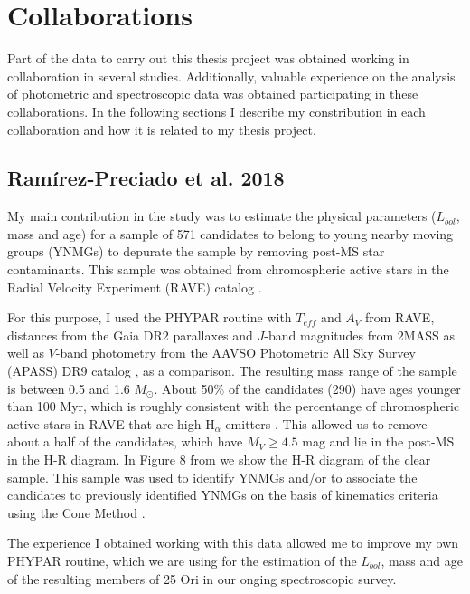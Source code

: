 \documentclass[12pt]{article}
\begin{document}
\appendix

\section{Collaborations}
\label{sec:collaborations}
Part of the data to carry out this thesis project was obtained working in collaboration in several studies. Additionally, valuable experience on the analysis of photometric and spectroscopic data was obtained participating in these collaborations. In the following sections I describe my constribution in each collaboration and how it is related to my thesis project.

\subsection{Ram\'irez-Preciado et al. 2018}
\label{sec:Ramirez-Preciado}
My main contribution in the \cite{Ramirez-Preciado2018} study was to estimate the physical parameters ($L_{bol}$, mass and age) for a sample of 571 candidates to belong to young nearby moving groups (YNMGs) to depurate the sample by removing post-MS star contaminants. This sample was obtained from chromospheric active stars in the Radial Velocity Experiment (RAVE) catalog \citep{Kunder2017}.

For this purpose, I used the PHYPAR routine with $T_{eff}$ and $A_V$ from RAVE, distances from the Gaia DR2 parallaxes and $J$-band magnitudes from 2MASS as well as $V$-band photometry from the AAVSO Photometric All Sky Survey (APASS) DR9 catalog \citep{Henden2016}, as a comparison. The resulting mass range of the sample is between 0.5 and 1.6 $M_\odot$. About 50\% of the candidates (290) have ages younger than 100 Myr, which is roughly consistent with the percentange of chromospheric active stars in RAVE that are high H$_\alpha$ emitters \citep{Zerjal2013}. This allowed us to remove about a half of the candidates, which have $M_V\ge4.5$ mag and lie in the post-MS in the H-R diagram. In Figure 8 from \citet{Ramirez-Preciado2018} we show the H-R diagram of the clear sample. This sample was used to identify YNMGs and/or to associate the candidates to previously identified YNMGs on the basis of kinematics criteria using the Cone Method \citep{Ramirez-Preciado2018}.

The experience I obtained working with this data allowed me to improve my own PHYPAR routine, which we are using for the estimation of the $L_{bol}$, mass and age of the resulting members of 25 Ori in our onging spectroscopic survey.
\end{document}
